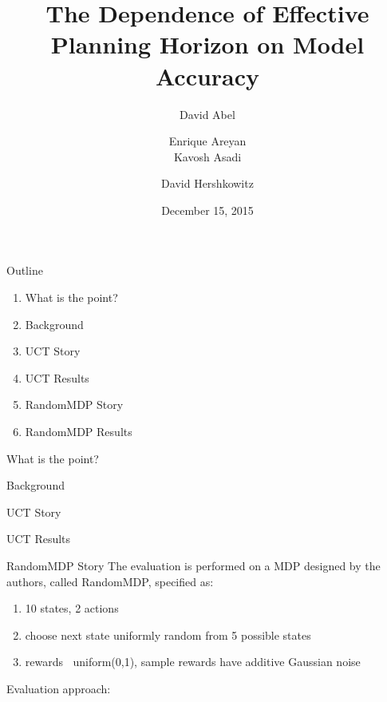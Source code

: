 \documentclass{beamer}
\title[The Dependence of Planning Horizon on Model Accuracy]{The Dependence of Effective Planning Horizon on Model Accuracy}
\author[]{David Abel  \and Enrique Areyan \\ Kavosh Asadi  \and David Hershkowitz}
\date{December 15, 2015}
\begin{document}
\begin{frame}
\titlepage
\end{frame}


\begin{frame}{Outline}
\begin{enumerate}
	\item What is the point?
	\item Background
	\item UCT Story
	\item UCT Results
	\item RandomMDP Story
	\item RandomMDP Results

\end{enumerate}
\end{frame}

\begin{frame}{What is the point?}
\end{frame}


\begin{frame}{Background}

\end{frame}


\begin{frame}{UCT Story}
\end{frame}

\begin{frame}{UCT Results}
\end{frame}

\begin{frame}{RandomMDP Story}
The evaluation is performed on a MDP designed by the authors, called RandomMDP, specified as:
\begin{enumerate}
\item 10 states, 2 actions
\item choose next state uniformly random from 5 possible states
\item rewards $~$ uniform(0,1), sample rewards have additive Gaussian noise
\end{enumerate}
Evaluation approach:


\end{frame}
\end{document}
